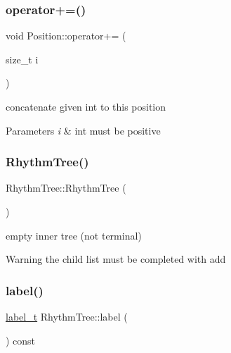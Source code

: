 \subsubsection{\texorpdfstring{operator+=()}{operator+=()}\hspace{0.1cm}{\footnotesize\ttfamily [2/2]}}
{\footnotesize\ttfamily void Position\+::operator+= (\begin{DoxyParamCaption}\item[{size\+\_\+t}]{i }\end{DoxyParamCaption})}



concatenate given int to this position 


\begin{DoxyParams}{Parameters}
{\em i} & int must be positive \\
\hline
\end{DoxyParams}
\mbox{\label{group__output_gac7614a6239a4917c771641dfdfd597ab}} 
\subsubsection{\texorpdfstring{RhythmTree()}{RhythmTree()}}
{\footnotesize\ttfamily Rhythm\+Tree\+::\+Rhythm\+Tree (\begin{DoxyParamCaption}{ }\end{DoxyParamCaption})}



empty inner tree (not terminal) 

\begin{DoxyWarning}{Warning}
the child list must be completed with add 
\end{DoxyWarning}
\mbox{\label{group__output_ga40e2aa462ed42fa46d3beafca9dbc350}} 
\subsubsection{\texorpdfstring{label()}{label()}}
{\footnotesize\ttfamily \mbox{\hyperlink{group__output_ga22fde970e635fcf63962743b2d5c441d}{label\+\_\+t}} Rhythm\+Tree\+::label (\begin{DoxyParamCaption}{ }\end{DoxyParamCaption}) const}



